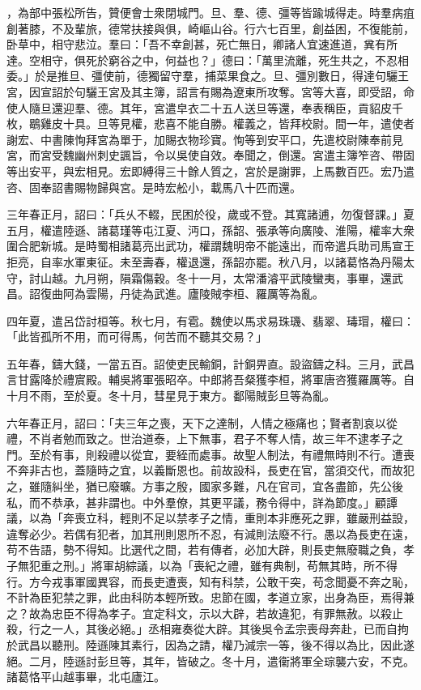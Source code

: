 \begin{pinyinscope}
，為部中張松所告，贊便會士衆閉城門。旦、羣、德、彊等皆踰城得走。時羣病疽創著膝，不及輩旅，德常扶接與俱，崎嶇山谷。行六七百里，創益困，不復能前，卧草中，相守悲泣。羣曰：「吾不幸創甚，死亡無日，卿諸人宜速進道，兾有所達。空相守，俱死於窮谷之中，何益也？」德曰：「萬里流離，死生共之，不忍相委。」於是推旦、彊使前，德獨留守羣，捕菜果食之。旦、彊別數日，得達句驪王宮，因宣詔於句驪王宮及其主簿，詔言有賜為遼東所攻奪。宮等大喜，即受詔，命使人隨旦還迎羣、德。其年，宮遣皁衣二十五人送旦等還，奉表稱臣，貢貂皮千枚，鶡雞皮十具。旦等見權，悲喜不能自勝。權義之，皆拜校尉。間一年，遣使者謝宏、中書陳恂拜宮為單于，加賜衣物珍寶。恂等到安平口，先遣校尉陳奉前見宮，而宮受魏幽州刺史諷旨，令以吳使自效。奉聞之，倒還。宮遣主簿笮咨、帶固等出安平，與宏相見。宏即縛得三十餘人質之，宮於是謝罪，上馬數百匹。宏乃遣咨、固奉詔書賜物歸與宮。是時宏舩小，載馬八十匹而還。

三年春正月，詔曰：「兵乆不輟，民困於役，歲或不登。其寬諸逋，勿復督課。」夏五月，權遣陸遜、諸葛瑾等屯江夏、沔口，孫韶、張承等向廣陵、淮陽，權率大衆圍合肥新城。是時蜀相諸葛亮出武功，權謂魏明帝不能遠出，而帝遣兵助司馬宣王拒亮，自率水軍東征。未至壽春，權退還，孫韶亦罷。秋八月，以諸葛恪為丹陽太守，討山越。九月朔，隕霜傷穀。冬十一月，太常潘濬平武陵蠻夷，事畢，還武昌。詔復曲阿為雲陽，丹徒為武進。廬陵賊李桓、羅厲等為亂。

四年夏，遣呂岱討桓等。秋七月，有雹。魏使以馬求易珠璣、翡翠、瑇瑁，權曰：「此皆孤所不用，而可得馬，何苦而不聽其交易？」

五年春，鑄大錢，一當五百。詔使吏民輸銅，計銅畀直。設盜鑄之科。三月，武昌言甘露降於禮賔殿。輔吳將軍張昭卒。中郎將吾粲獲李桓，將軍唐咨獲羅厲等。自十月不雨，至於夏。冬十月，彗星見于東方。鄱陽賊彭旦等為亂。

六年春正月，詔曰：「夫三年之喪，天下之達制，人情之極痛也；賢者割哀以從禮，不肖者勉而致之。世治道泰，上下無事，君子不奪人情，故三年不逮孝子之門。至於有事，則殺禮以從宜，要絰而處事。故聖人制法，有禮無時則不行。遭喪不奔非古也，蓋隨時之宜，以義斷恩也。前故設科，長吏在官，當須交代，而故犯之，雖隨糾坐，猶已廢曠。方事之殷，國家多難，凡在官司，宜各盡節，先公後私，而不恭承，甚非謂也。中外羣僚，其更平議，務令得中，詳為節度。」顧譚議，以為「奔喪立科，輕則不足以禁孝子之情，重則本非應死之罪，雖嚴刑益設，違奪必少。若偶有犯者，加其刑則恩所不忍，有減則法廢不行。愚以為長吏在遠，苟不告語，勢不得知。比選代之間，若有傳者，必加大辟，則長吏無廢職之負，孝子無犯重之刑。」將軍胡綜議，以為「喪紀之禮，雖有典制，苟無其時，所不得行。方今戎事軍國異容，而長吏遭喪，知有科禁，公敢干突，苟念聞憂不奔之恥，不計為臣犯禁之罪，此由科防本輕所致。忠節在國，孝道立家，出身為臣，焉得兼之？故為忠臣不得為孝子。宜定科文，示以大辟，若故違犯，有罪無赦。以殺止殺，行之一人，其後必絕。」丞相雍奏從大辟。其後吳令孟宗喪母奔赴，已而自拘於武昌以聽刑。陸遜陳其素行，因為之請，權乃減宗一等，後不得以為比，因此遂絕。二月，陸遜討彭旦等，其年，皆破之。冬十月，遣衞將軍全琮襲六安，不克。諸葛恪平山越事畢，北屯廬江。


\end{pinyinscope}
